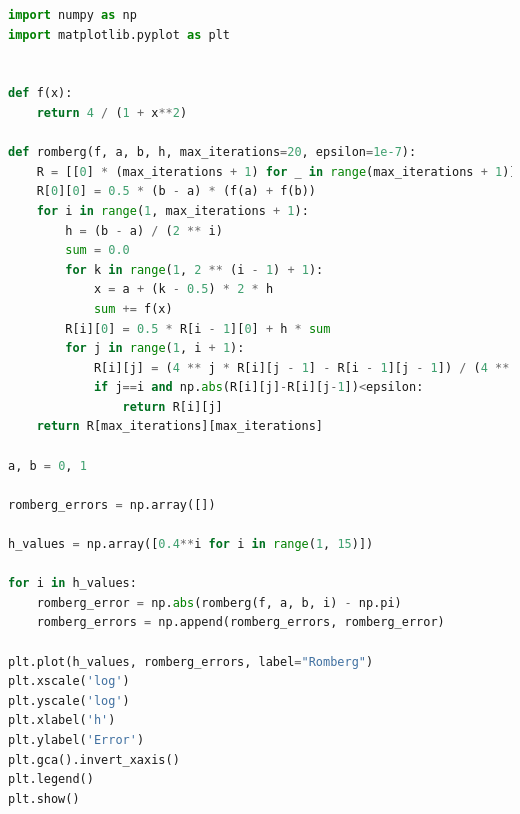 \documentclass[a4paper,11pt,notitlepage]{article}
\begin{document}
\begin{lstlisting}[language=Python,caption={Fifth Chapter 1B.py},label={code1.2}]
import numpy as np
import matplotlib.pyplot as plt


def f(x):
    return 4 / (1 + x**2)

def romberg(f, a, b, h, max_iterations=20, epsilon=1e-7):
    R = [[0] * (max_iterations + 1) for _ in range(max_iterations + 1)]
    R[0][0] = 0.5 * (b - a) * (f(a) + f(b))
    for i in range(1, max_iterations + 1):
        h = (b - a) / (2 ** i)
        sum = 0.0
        for k in range(1, 2 ** (i - 1) + 1):
            x = a + (k - 0.5) * 2 * h
            sum += f(x)
        R[i][0] = 0.5 * R[i - 1][0] + h * sum
        for j in range(1, i + 1):
            R[i][j] = (4 ** j * R[i][j - 1] - R[i - 1][j - 1]) / (4 ** j - 1)
            if j==i and np.abs(R[i][j]-R[i][j-1])<epsilon:
                return R[i][j]
    return R[max_iterations][max_iterations]

a, b = 0, 1

romberg_errors = np.array([])

h_values = np.array([0.4**i for i in range(1, 15)])

for i in h_values:
    romberg_error = np.abs(romberg(f, a, b, i) - np.pi)
    romberg_errors = np.append(romberg_errors, romberg_error)

plt.plot(h_values, romberg_errors, label="Romberg")
plt.xscale('log')
plt.yscale('log')
plt.xlabel('h')
plt.ylabel('Error')
plt.gca().invert_xaxis()
plt.legend()
plt.show()
\end{lstlisting}
\end{document}
